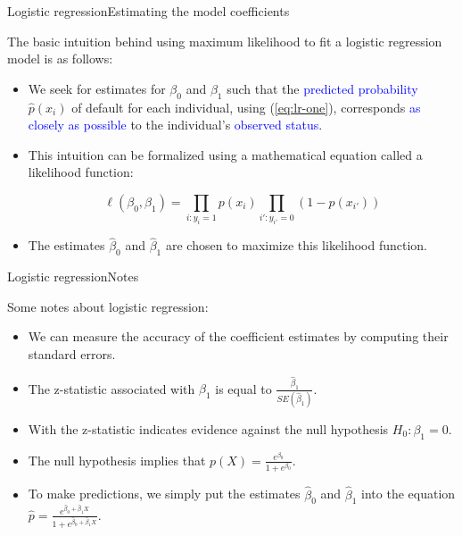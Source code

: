 \begin{frame}{Logistic regression}{Estimating the model coefficients}

    The basic intuition behind using maximum likelihood to fit a logistic regression model is as follows: \pause
    

    \begin{itemize}
        \item We seek for estimates for $\beta_0$ and $\beta_1$ such that the \textcolor{blue}{predicted probability} $\hat{p}(x_i)$ of default for each individual, using (\ref{eq:lr-one}), corresponds \textcolor{blue}{as closely as possible} to the individual's \textcolor{blue}{observed status}. \pause

        \item This intuition can be formalized using a mathematical equation called a likelihood function: \pause 

        \begin{equation}
            \ell(\beta_0, \beta_1) = \prod_{i:y_i =1} p(x_i) \prod_{i':y_{i'}=0} (1-p(x_{i'}))
        \end{equation} \pause 

        \item The estimates $\hat{\beta}_0$ and $\hat{\beta}_1$ are chosen to maximize this likelihood function. 
    \end{itemize}


    
\end{frame}


\begin{frame}{Logistic regression}{Notes}

Some notes about logistic regression:

\begin{itemize}
    \item We can measure the accuracy of the coeﬃcient estimates by computing their standard errors. \pause

    \item The z-statistic associated with $\beta_1$ is equal to $ \frac{\hat{\beta}_1}{SE(\hat{\beta}_1)}$. \pause

    \item With the z-statistic indicates evidence against the null hypothesis $H_0: \beta_1 = 0$. \pause

    \item The null hypothesis implies that $ p(X) = \frac{e^{\beta_0}}{1+e^{\beta_0}}.$ \pause

    \item To make predictions, we simply put the estimates $\hat{\beta}_0$ and $\hat{\beta}_1$ into the equation $\hat{p} = \frac{e^{\hat{\beta}_0 + \hat{\beta}_1 X}}{1 + e^{\hat{\beta}_0 + \hat{\beta}_1 X}}.$
\end{itemize}
    
\end{frame}

